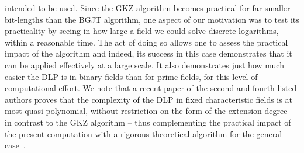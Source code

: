 \documentclass[11pt]{llncs}
\begin{document}
intended to be used. Since the GKZ algorithm becomes practical for far smaller bit-lengths than the BGJT algorithm, one aspect of our motivation was to
test its practicality by seeing in how large a field we could solve discrete logarithms, within a reasonable time. The act of doing so allows one to
assess the practical impact of the algorithm and indeed, its success in this case demonstrates that it can be applied effectively at a large scale.
It also demonstrates just how much easier the DLP is in binary fields than for prime fields, for this level of computational effort.
We note that a recent paper of the second and fourth listed authors proves that the complexity of the DLP in fixed characteristic fields is at most
quasi-polynomial, without restriction on the form of the extension degree -- in contrast to the GKZ algorithm -- thus complementing the practical
impact of the present computation with a rigorous theoretical algorithm for the general case~\cite{KW19}.
\end{document}
